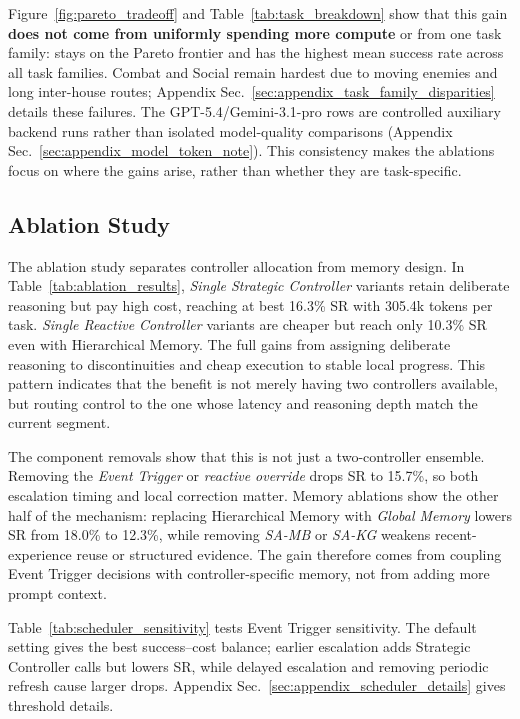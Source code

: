 Figure~\mbox{\ref{fig:pareto_tradeoff}} and
Table~\mbox{\ref{tab:task_breakdown}} show that this gain \textbf{does not come from
uniformly spending more compute} or from one task family: \method{} stays on the
Pareto frontier and has the highest mean success rate across all task families.
Combat and Social remain hardest due to moving enemies and long inter-house
routes; Appendix Sec.~\mbox{\ref{sec:appendix_task_family_disparities}} details
these failures. The GPT-5.4/Gemini-3.1-pro rows are controlled auxiliary backend
runs rather than isolated model-quality comparisons (Appendix
Sec.~\mbox{\ref{sec:appendix_model_token_note}}).
This consistency makes the ablations focus on where the gains arise, rather than whether they are task-specific.







\subsection{Ablation Study}
\label{sec:ablation}

The ablation study separates controller allocation from memory design. In
Table~\mbox{\ref{tab:ablation_results}}, \emph{Single Strategic Controller} variants
retain deliberate reasoning but pay high cost, reaching at best 16.3\% SR with
305.4k tokens per task. \emph{Single Reactive Controller} variants are cheaper
but reach only 10.3\% SR even with Hierarchical Memory. The full \method{} gains
from assigning deliberate reasoning to discontinuities and cheap execution to
stable local progress. This pattern indicates that the benefit is not merely
having two controllers available, but routing control to the one whose latency
and reasoning depth match the current segment.

The component removals show that this is not just a two-controller ensemble.
Removing the \emph{Event Trigger} or \emph{reactive override} drops SR to 15.7\%,
so both escalation timing and local correction matter. Memory ablations show the
other half of the mechanism: replacing Hierarchical Memory with \emph{Global
Memory} lowers SR from 18.0\% to 12.3\%, while removing \emph{SA-MB} or
\emph{SA-KG} weakens recent-experience reuse or structured evidence. The gain
therefore comes from coupling Event Trigger decisions with controller-specific
memory, not from adding more prompt context.



Table~\mbox{\ref{tab:scheduler_sensitivity}} tests Event Trigger sensitivity.
The default setting gives the best success--cost balance; earlier escalation
adds Strategic Controller calls but lowers SR, while delayed escalation and
removing periodic refresh cause larger drops. Appendix
Sec.~\mbox{\ref{sec:appendix_scheduler_details}} gives threshold details.

